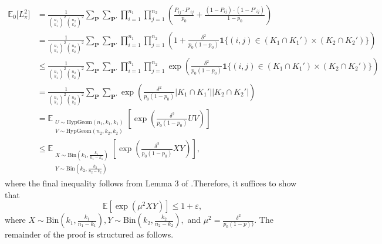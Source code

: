 \documentclass{article}
\newcommand{\bP}{\mathbf{P}}
\newcommand{\EE}{\mathbb{E}}
\newcommand{\one}{\mathbf{1}}
\newcommand{\eps}{\varepsilon} %
\begin{document}
\begin{align*}
    \EE_0\big[L_\pi^2\big] &= \frac{1}{{n_1 \choose k_1}^2 {n_2 \choose k_2}^2}\sum_{\bP}\sum_{\bP'}\prod_{i=1}^{n_1}\prod_{j=1}^{n_2}\left(\frac{P_{ij}\cdot P'_{ij}}{p_{0}}
    +    
    \frac{ (1-P_{ij}) \cdot (1-P'_{ij})}{1-p_{0}}\right) \\
    &= \frac{1}{{n_1 \choose k_1}^2 {n_2 \choose k_2}^2}\sum_{\bP}\sum_{\bP'}\prod_{i=1}^{n_1}\prod_{j=1}^{n_2}\left(1 + \frac{\delta^2}{p_0(1-p_0)}\one \{ (i,j) \in (K_1 \cap K_1') \times (K_2 \cap K_2')\}\right) \\
    &\leq \frac{1}{{n_1 \choose k_1}^2 {n_2 \choose k_2}^2}\sum_{\bP}\sum_{\bP'}\prod_{i=1}^{n_1}\prod_{j=1}^{n_2}\exp\left(\frac{\delta^2}{p_0(1-p_0)}\one \{ (i,j) \in (K_1 \cap K_1') \times (K_2 \cap K_2')\}\right) \\
    &= \frac{1}{{n_1 \choose k_1}^2 {n_2 \choose k_2}^2}\sum_{\bP}\sum_{\bP'}\exp\left(\frac{\delta^2}{p_0(1-p_0)}|K_1 \cap K_1'| |K_2 \cap K_2'|\right) \\
    &= \EE_{\substack{U \sim \text{HypGeom}(n_1, k_1, k_1) \\ V \sim \text{HypGeom}(n_2, k_2, k_2)}}\left[\exp\left(\frac{\delta^2}{p_0(1-p_0)} UV\right)\right] \\
    &\leq \EE_{\substack{X \sim \text{Bin}(k_1, \frac{k_1}{n_1 - k_1}) \\ Y \sim \text{Bin}(k_2, \frac{k_2}{n_2 - k_2})}}\left[\exp\left(\frac{\delta^2}{p_0(1-p_0)} XY\right)\right],
\end{align*}
where the final inequality follows from Lemma 3 of \cite{arias2011global}.Therefore, it suffices to show that
\begin{equation}\label{eq_mgf_goal}
    \EE[\exp(\mu^2XY)] \leq 1+\eps,
\end{equation}
where $X \sim \text{Bin}(k_1, \frac{k_1}{n_1 - k_1}), Y \sim \text{Bin}(k_2, \frac{k_2}{n_2 - k_2}),$ and $\mu^2 = \frac{\delta^2}{p_0(1 - p))}$. The remainder of the proof is structured as follows.
\end{document}
